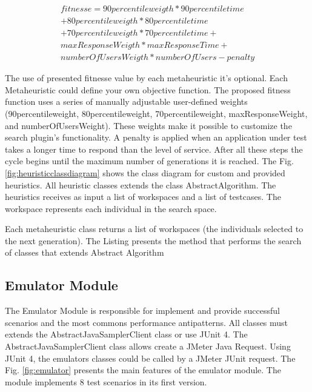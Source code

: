\documentclass[times]{stvrauth}
\begin{document}
\begin{equation}
\begin{aligned}
fitnesse=90percentileweigth* 90percentiletime\\
+80percentileweigth*80percentiletime\\+
70percentileweigth*70percentiletime+\\
maxResponseWeigth*maxResponseTime+\\
numberOfUsersWeigth*numberOfUsers-penalty
\end{aligned}
\end{equation}

The use of presented fitnesse value by each metaheuristic it's optional. Each Metaheuristic could define your own objective function. The proposed  fitness function uses a series of manually adjustable user-defined weights (90percentileweight, 80percentileweight,  70percentileweight, maxResponseWeight, and numberOfUsersWeight). These weights make it possible to customize the search plugin's functionality. A penalty is applied when an application under test takes a longer time to respond than the level of service. After all these steps the cycle begins until the maximum number of generations it is reached. The Fig. \ref{fig:heuristicclassdiagram} shows the  class diagram for custom and provided heuristics. All heuristic classes extends the class AbstractAlgorithm. The heuristics receives  as input a  list of workspaces and a list of testcases. The workspace represents each individual in the search space.


Each metaheuristic class returns a list of workspaces (the individuals selected to the next generation). The Listing presents the method that performs the search of classes that extends Abstract Algorithm



\subsection{Emulator Module}

The Emulator Module is responsible for implement and provide successful scenarios and the most commons performance antipatterns. All classes must extends the AbstractJavaSamplerClient class or use JUnit 4. The AbstractJavaSamplerClient class allows create a JMeter Java Request.  Using JUnit 4, the emulators classes could be called by a JMeter JUnit request. The Fig. \ref{fig:emulator} presents the main features of the emulator module. The module implements 8 test scenarios in its first version.
\end{document}
